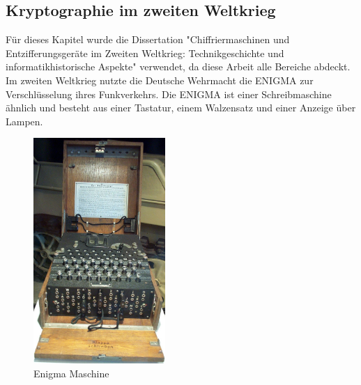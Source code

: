 \subsection{Kryptographie im zweiten Weltkrieg}
Für dieses Kapitel wurde die Dissertation "Chiffriermaschinen und Entzifferungsgeräte
im Zweiten Weltkrieg: Technikgeschichte und informatikhistorische Aspekte" \cite{enigma} verwendet, da diese Arbeit alle Bereiche abdeckt. \\
Im zweiten Weltkrieg nutzte die Deutsche Wehrmacht die ENIGMA zur Verschlüsselung ihres Funkverkehrs. Die ENIGMA ist einer Schreibmaschine ähnlich und besteht aus einer Tastatur, einem Walzensatz und einer Anzeige über Lampen. 
%
\begin{figure}[ht]
\begin{center}
\includegraphics[width=5cm]{images/Enigma_Verkehrshaus_Luzern_cropped.jpg}
\caption{Enigma Maschine}
\end{center}
\end{figure}
%
